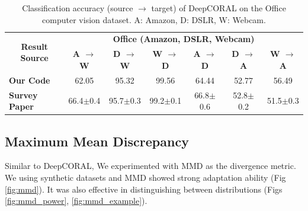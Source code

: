 \documentclass{article}
\begin{document}
\begin{table}
  \caption{Classification accuracy (source $\rightarrow$ target) of DeepCORAL on the Office computer vision dataset. A: Amazon, D: DSLR, W: Webcam.}
  \label{comparePerformance2}
  \begin{scriptsize}
  \begin{center}
  {\renewcommand{\arraystretch}{1.4}
  \begin{tabular}{@{}l cccccc@{}}
  \toprule
  \multicolumn{1}{c}{\multirow{2}{*}{\textbf{Result Source}}} & \multicolumn{6}{c}{\textbf{Office (Amazon, DSLR, Webcam)}} \\
  \cmidrule{2-7}
   & \textbf{A $\rightarrow$ W} & \textbf{D $\rightarrow$ W} & \textbf{W $\rightarrow$ D} & \textbf{A $\rightarrow$ D} & \textbf{D $\rightarrow$ A} & \textbf{W $\rightarrow$ A} \\
  \midrule
  \textbf{Our Code} & 62.05 & 95.32 & 99.56 & 64.44 & 52.77 & 56.49\\
  \hline
  \textbf{Survey Paper} & 66.4$\pm$0.4 & 95.7$\pm$0.3 & 99.2$\pm$0.1 & 66.8$\pm$0.6 & 52.8$\pm$0.2 & 51.5$\pm$0.3\\
  \bottomrule
  \end{tabular}
  }
  \end{center}
  \end{scriptsize}
  \label{tab:deepcoral}
\end{table}

\subsection{Maximum Mean Discrepancy}
Similar to DeepCORAL\cite{DeepCoral}, We experimented with MMD as the divergence metric. We using synthetic datasets and MMD showed strong adaptation ability (Fig \ref{fig:mmd}). It was also effective in  distinguishing between distributions (Figs \ref{fig:mmd_power}, \ref{fig:mmd_example}).
\end{document}
